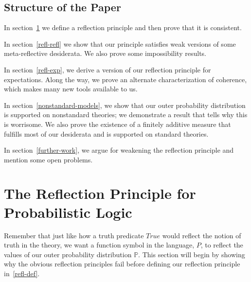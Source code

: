 \documentclass[12pt]{article}
\newcommand{\PP}{\mathbb{P}}
\theoremstyle{plain}
\theoremstyle{definition}
\theoremstyle{remark}
\begin{document}
\subsection{Structure of the Paper}
In section~\ref{refl-cons} we define a reflection principle and then prove that it is consistent. 

In section~\ref{refl-refl} we show that our principle satisfies weak versions of some meta-reflective desiderata. We also prove some impossibility results.

In section~\ref{refl-exp}, we derive a version of our reflection principle for expectations. Along the way, we prove an alternate characterization of coherence, which makes many new tools available to us. 

In section~\ref{nonstandard-models}, we show that our outer probability distribution is supported on nonstandard theories; we demonstrate a result that tells why this is worrisome. We also prove the existence of a finitely additive measure that fulfills most of our desiderata and is supported on standard theories. 

In section~\ref{further-work}, we argue for weakening the reflection principle and mention some open problems. 

\section{The Reflection Principle for Probabilistic Logic}
\label{refl-cons}




Remember that just like how a truth predicate $True$ would reflect the notion of truth in the theory, we want a function symbol in the language, $P$, to reflect the values of our outer probability distribution $\PP$.
This section will begin by showing why the obvious reflection principles fail before defining our reflection principle in~\ref{refl-def}.
\end{document}
